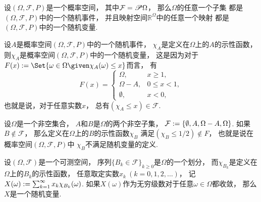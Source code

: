 \begin{example}
设\((\Omega,\mathcal{F},P)\)是一个概率空间，
其中\(\mathcal{F} = \mathscr{P}\Omega\)，
那么\(\Omega\)的任意一个子集
都是\((\Omega,\mathcal{F},P)\)中的一个随机事件，
并且映射空间\(\mathbb{R}^\Omega\)中的任意一个映射
都是\((\Omega,\mathcal{F},P)\)中的一个随机变量.
\end{example}

\begin{example}
设\(A\)是概率空间\((\Omega,\mathcal{F},P)\)中的一个随机事件，
\(\chi_A\)是定义在\(\Omega\)上的\(A\)的示性函数，
则\(\chi_A\)是概率空间\((\Omega,\mathcal{F},P)\)中的一个随机变量，
这是因为对于\(
	F(x)
	\defeq
	\Set{
		\omega \in \Omega
		\given
		\chi_A(\omega) \leq x
	}
\)而言，
有\begin{equation*}
	F(x) = \begin{cases}
		\Omega, & x \geq 1, \\
		\Omega-A, & 0 \leq x < 1, \\
		\emptyset, & x < 0,
	\end{cases}
\end{equation*}
也就是说，对于任意实数\(x\)，
总有\(
	(\chi_A \leq x)
	\in \mathcal{F}
\).
\end{example}

\begin{example}
设\(\Omega\)是一个非空集合，
\(A\)和\(B\)是\(\Omega\)的两个非空子集，
\(\mathcal{F} := \{\emptyset,A,\Omega-A,\Omega\}\).
如果\(B \notin \mathcal{F}\)，
那么定义在\(\Omega\)上的\(B\)的示性函数\(\chi_B\)
满足\((\chi_B \leq 1/2) \notin F\)，
也就是说在概率空间\((\Omega,\mathcal{F},P)\)中
\(\chi_B\)不满足随机变量的定义.
\end{example}

\begin{example}
设\((\Omega,\mathcal{F})\)是一个可测空间，
序列\(\{B_k \in \mathcal{F}\}_{k\geq0}\)是\(\Omega\)的一个划分，
而\(\chi_{B_k}\)是定义在\(\Omega\)上的\(B_k\)的示性函数，
任意取定实数\(x_k\ (k=0,1,2,\dotsc)\)，
记\(
	X(\omega) := \sum_{k=1}^\infty x_k \chi_{B_k}(\omega)
\).
如果\(X(\omega)\)作为无穷级数对于任意\(\omega \in \Omega\)都收敛，
那么\(X\)是一个随机变量.
\end{example}
